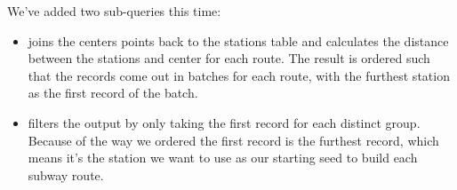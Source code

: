 \documentclass[a4paper,11pt,english]{sphinxmanual}
\begin{document}
\begin{sphinxVerbatim}[commandchars=\\\{\}]
   
      
      
  
     
    
    
      
  
      
   
    
  
       
       
     
      
  
      
   
   
\end{sphinxVerbatim}

We’ve added two sub-queries this time:
\begin{itemize}
\item {} 
 joins the centers points back to the stations table and calculates the distance between the stations and center for each route. The result is ordered such that the records come out in batches for each route, with the furthest station as the first record of the batch.

\item {} 
 filters the  output by only taking the first record for each distinct group. Because of the way we ordered  the first record is the furthest record, which means it’s the station we want to use as our starting seed to build each subway route.

\end{itemize}
\end{document}
